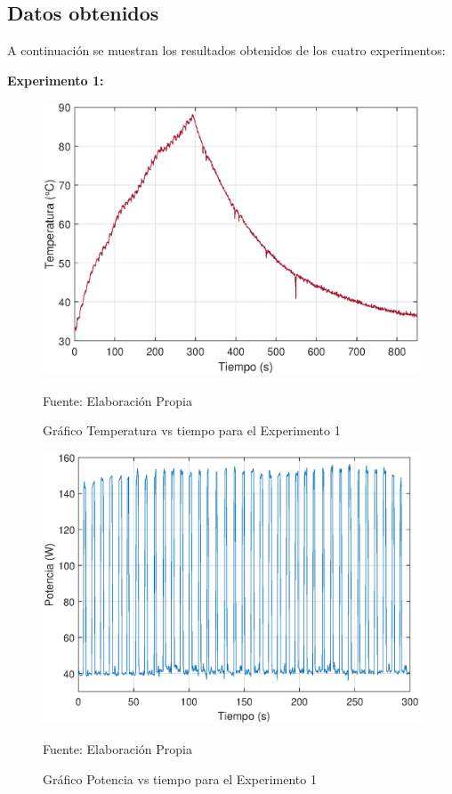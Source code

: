 \subsection{Datos obtenidos}

A continuación se muestran los resultados obtenidos de los cuatro experimentos:

\textbf{Experimento 1:}

\begin{figure}[H]
\centering
\includegraphics[scale=0.65]{Figuras/Exp2_T.eps}
\caption{Gráfico Temperatura vs tiempo para el Experimento 1}
Fuente: Elaboración Propia
\label{exp1_T}
\end{figure}

\begin{figure}[H]
\centering
\includegraphics[scale=0.65]{Figuras/Exp2_P.eps}
\caption{Gráfico Potencia vs tiempo para el Experimento 1}
Fuente: Elaboración Propia
\label{exp1_P}
\end{figure}

